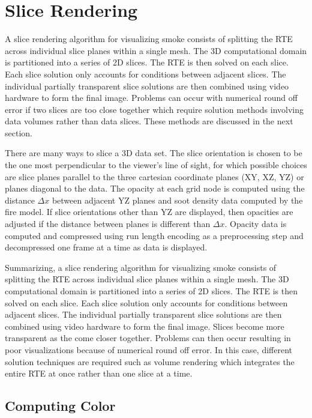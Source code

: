 {\section{Slice Rendering}
A slice rendering algorithm for visualizing smoke consists of
splitting the RTE across individual slice planes within a single
mesh.  The 3D computational domain is partitioned into a series of
2D slices.  The RTE is then solved on each slice.  Each slice
solution only accounts for conditions between adjacent slices.
The individual partially transparent slice solutions are then
combined using video hardware to form the final image.   Problems
can occur with numerical round off error if two slices are too
close together which require solution methods  involving data
volumes rather than data slices. These methods are discussed in
the next section.

There are many ways to slice a 3D data set.  The slice orientation
is chosen to be the one most perpendicular to the viewer's line of
sight, for which possible choices are slice planes parallel to the
three cartesian coordinate planes (XY, XZ, YZ) or planes diagonal
to the data.  The opacity at each grid node is computed using the
distance $\Delta x$ between adjacent YZ planes and soot density
data computed by the fire model.  If slice orientations other than
YZ are displayed, then opacities are adjusted if the distance
between planes is different than $\Delta x$.  Opacity data is
computed and compressed using run length encoding as a
preprocessing step and decompressed one frame at a time as data is
displayed.


Summarizing, a slice rendering algorithm for visualizing smoke consists of
splitting the RTE across individual slice planes within a single
mesh.  
The 3D computational domain is partitioned into a series of
2D slices.  The RTE is then solved on each slice.  Each slice
solution only accounts for conditions between adjacent slices.
The individual partially transparent slice solutions are then
combined using video hardware to form the final image.
Slices become more transparent as the come closer together. Problems
can then occur resulting in poor  visualizations because of numerical round off error.
In this case, different solution techniques are required such as volume rendering which integrates the entire RTE at once rather than one slice at a time.


\subsection{Computing Color}

}
